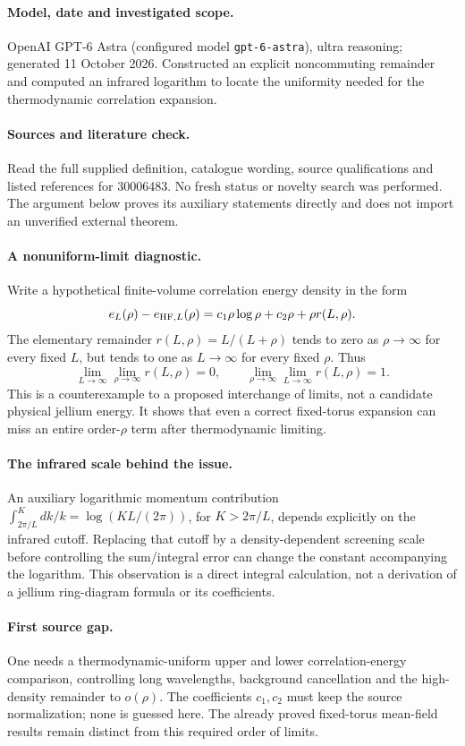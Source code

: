 \documentclass[11pt]{article}
\begin{document}
\paragraph{Model, date and investigated scope.}
OpenAI GPT-6 Astra (configured model \texttt{gpt-6-astra}), ultra reasoning; generated 11 October 2026. Constructed an explicit noncommuting remainder and computed an infrared logarithm to locate the uniformity needed for the thermodynamic correlation expansion.

\paragraph{Sources and literature check.}
Read the full supplied definition, catalogue wording, source qualifications and listed references for 30006483. No fresh status or novelty search was performed. The argument below proves its auxiliary statements directly and does not import an unverified external theorem.

\paragraph{A nonuniform-limit diagnostic.} Write a hypothetical finite-volume correlation energy density in the form
\[
 e_L(\rho)-e_{{\rm HF},L}(\rho)
 =c_1\rho\log\rho+c_2\rho+\rho r(L,\rho).
\]
The elementary remainder \(r(L,\rho)=L/(L+\rho)\) tends to zero as \(\rho\to\infty\) for every fixed \(L\), but tends to one as \(L\to\infty\) for every fixed \(\rho\). Thus
\[
 \lim_{L\to\infty}\lim_{\rho\to\infty}r(L,\rho)=0,
 \qquad
 \lim_{\rho\to\infty}\lim_{L\to\infty}r(L,\rho)=1.
\]
This is a counterexample to a proposed interchange of limits, not a candidate physical jellium energy. It shows that even a correct fixed-torus expansion can miss an entire order-\(\rho\) term after thermodynamic limiting.
\paragraph{The infrared scale behind the issue.} An auxiliary logarithmic momentum contribution \(\int_{2\pi/L}^K dk/k=\log(KL/(2\pi))\), for \(K>2\pi/L\), depends explicitly on the infrared cutoff. Replacing that cutoff by a density-dependent screening scale before controlling the sum/integral error can change the constant accompanying the logarithm. This observation is a direct integral calculation, not a derivation of a jellium ring-diagram formula or its coefficients.
\paragraph{First source gap.} One needs a thermodynamic-uniform upper and lower correlation-energy comparison, controlling long wavelengths, background cancellation and the high-density remainder to \(o(\rho)\). The coefficients \(c_1,c_2\) must keep the source normalization; none is guessed here. The already proved fixed-torus mean-field results remain distinct from this required order of limits.
\end{document}
